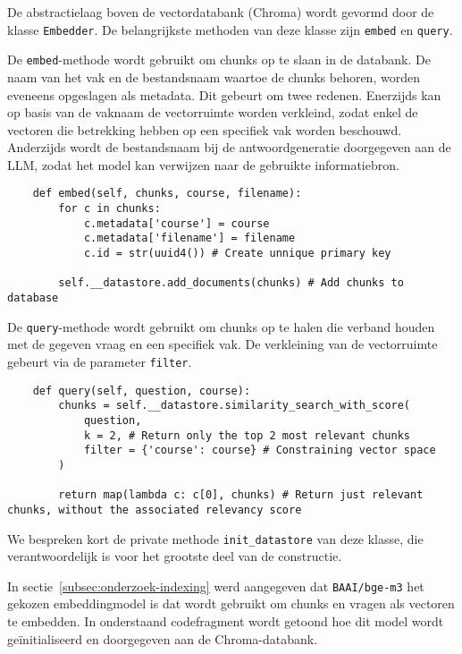 De abstractielaag boven de vectordatabank (Chroma) wordt gevormd door de klasse \texttt{Embedder}. De belangrijkste methoden van deze klasse zijn \texttt{embed} en \texttt{query}.

De \texttt{embed}-methode wordt gebruikt om chunks op te slaan in de databank. De naam van het vak en de bestandsnaam waartoe de chunks behoren, worden eveneens opgeslagen als metadata. Dit gebeurt om twee redenen. Enerzijds kan op basis van de vaknaam de vectorruimte worden verkleind, zodat enkel de vectoren die betrekking hebben op een specifiek vak worden beschouwd. Anderzijds wordt de bestandsnaam bij de antwoordgeneratie doorgegeven aan de \acrshort{LLM}, zodat het model kan verwijzen naar de gebruikte informatiebron.

\begin{verbatim}
    def embed(self, chunks, course, filename):
        for c in chunks:
            c.metadata['course'] = course 
            c.metadata['filename'] = filename
            c.id = str(uuid4()) # Create unnique primary key
    
        self.__datastore.add_documents(chunks) # Add chunks to database
\end{verbatim}

De \texttt{query}-methode wordt gebruikt om chunks op te halen die verband houden met de gegeven vraag en een specifiek vak. De verkleining van de vectorruimte gebeurt via de parameter \texttt{filter}. 

\begin{verbatim}
    def query(self, question, course):
        chunks = self.__datastore.similarity_search_with_score(
            question, 
            k = 2, # Return only the top 2 most relevant chunks
            filter = {'course': course} # Constraining vector space
        )
    
        return map(lambda c: c[0], chunks) # Return just relevant chunks, without the associated relevancy score
\end{verbatim}

We bespreken kort de private methode \texttt{init\_datastore} van deze klasse, die verantwoordelijk is voor het grootste deel van de constructie.

In sectie~\ref{subsec:onderzoek-indexing} werd aangegeven dat \texttt{BAAI/bge-m3} het gekozen embeddingmodel is dat wordt gebruikt om chunks en vragen als vectoren te embedden. In onderstaand codefragment wordt getoond hoe dit model wordt geïnitialiseerd en doorgegeven aan de Chroma-databank.

